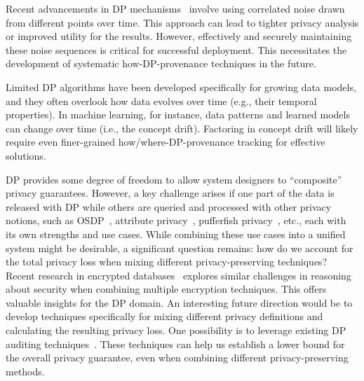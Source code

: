 Recent advancements in DP mechanisms~\cite{mazmudar2022cache,ge2019apex,pioneer,WhitehouseRWR22brownian} involve using correlated noise drawn from different points over time. This approach can lead to tighter privacy analysis or improved utility for the results. However, effectively and securely maintaining these noise sequences is critical for successful deployment. This necessitates the development of systematic how-DP-provenance techniques in the future. 

Limited DP algorithms have been developed specifically for growing data models, and they often overlook how data evolves over time (e.g., their temporal properties). In machine learning, for instance, data patterns and learned models can change over time (i.e., the concept drift).  Factoring in concept drift will likely require even finer-grained how/where-DP-provenance tracking for effective solutions.

DP provides some degree of freedom to allow system designers to ``composite'' privacy guarantees.
However, a key challenge arises if one part of the data is released with DP while others are queried and processed with other privacy notions, such as OSDP~\cite{kotsogiannis2020one}, attribute privacy~\cite{zhang2020attribute}, pufferfish privacy~\cite{kifer2014pufferfish}, etc., each with its own strengths and use cases. While combining these use cases into a unified system might be desirable, a significant question remains: how do we account for the total privacy loss when mixing different privacy-preserving techniques?
Recent research in encrypted databases~\cite{zhang2024SNF} explores similar challenges in reasoning about security when combining multiple encryption techniques.  This offers valuable insights for the DP domain. An interesting future direction would be to develop techniques specifically for mixing different privacy definitions and calculating the resulting privacy loss. One possibility is to leverage existing DP auditing techniques~\cite{PillutlaAKMOO23DP_audit,JagielskiUO20audit_DP,NasrH0BTJCT23DP_audit}. These techniques can help us establish a lower bound for the overall privacy guarantee, even when combining different privacy-preserving methods.


